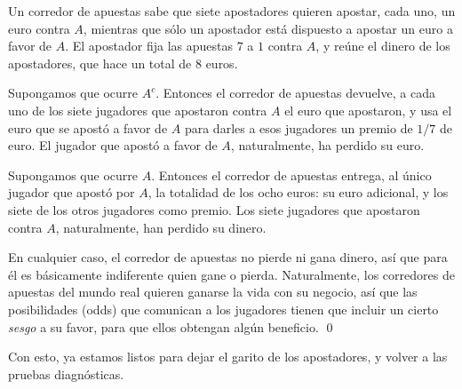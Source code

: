 \begin{ejemplo}
\label{cap03:ejem:OddsReglasApuestas}
Un corredor de apuestas sabe que siete apostadores quieren apostar, cada uno, un euro contra $A$, mientras que sólo un apostador está dispuesto a apostar un euro a favor de $A$. El apostador fija las apuestas $7$ a $1$ contra $A$, y reúne el dinero de los apostadores, que hace un total de $8$ euros.

Supongamos que ocurre $A^c$. Entonces el corredor de apuestas devuelve, a cada uno de los siete jugadores que apostaron contra $A$ el euro que apostaron, y usa el euro que se apostó a favor de $A$ para darles a esos jugadores un premio de $1/7$ de euro. El jugador que apostó a favor de $A$, naturalmente, ha perdido su euro.

Supongamos que ocurre $A$. Entonces el corredor de apuestas entrega, al único jugador que apostó por $A$, la totalidad de los ocho euros: su euro adicional, y los siete de los otros jugadores como premio. Los siete jugadores que apostaron contra $A$, naturalmente, han perdido su dinero.

En cualquier caso, el corredor de apuestas no pierde ni gana dinero, así que para él es básicamente indiferente quien gane o pierda. Naturalmente, los corredores de apuestas del mundo real quieren ganarse la vida con su negocio, así que las posibilidades (odds) que comunican a los jugadores tienen que incluir un cierto {\em sesgo} a su favor, para que ellos obtengan algún beneficio.
\qed
\end{ejemplo}
Con esto, ya estamos listos para dejar el garito de los apostadores, y volver a las pruebas diagnósticas.

